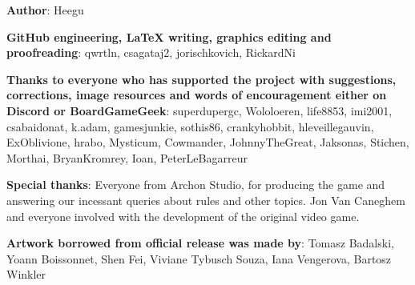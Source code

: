 
\bigbreak

\begin{multicols*}{2}

\textbf{Author}: Heegu\par
\textbf{GitHub engineering, LaTeX writing, graphics editing and proofreading}: qwrtln, csagataj2, jorischkovich, RickardNi\par
\textbf{Thanks to everyone who has supported the project with suggestions, corrections, image resources and words of encouragement either on Discord or BoardGameGeek}: superdupergc, Wololoeren, life8853, imi2001, csabaidonat, k.adam, gamesjunkie, sothis86, cranky\textunderscore hobbit, hleveillegauvin, ExOblivione, hrabo, Mysticum, Cowmander, JohnnyTheGreat, Jaksonas, Stichen, Morthai, BryanKromrey, Ioan, PeterLeBagarreur\par
\textbf{Special thanks}: Everyone from Archon Studio, for producing the game and answering our incessant queries about rules and other topics.
Jon Van Caneghem and everyone involved with the development of the original video game.\par
\textbf{Artwork borrowed from official release was made by}: Tomasz Badalski, Yoann Boissonnet, Shen Fei, Viviane Tybusch Souza, Iana Vengerova, Bartosz Winkler

\end{multicols*}